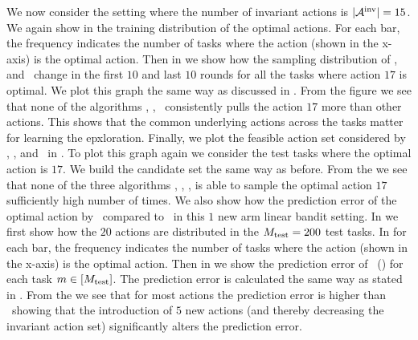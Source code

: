 \documentclass[10pt]{article}
\theoremstyle{plain}
\theoremstyle{definition}
\theoremstyle{remark}
\begin{document}
We now consider the setting where the number of invariant actions is $|\mathcal{A}^{\text{inv}}| = 15$.
We again show in  the training distribution of the optimal actions. For each bar, the frequency indicates the number of tasks where the action (shown in the x-axis) is the optimal action. Then in  we show how the sampling distribution of \dptg, \pred\, and \predt\ change in the first $10$ and last $10$ rounds for all the tasks where action $17$ is optimal. We plot this graph the same way as discussed in .
From the figure  we see that none of the algorithms \pred, \predt, \dptg\ consistently pulls the action $17$ more than other actions. This shows that the common underlying actions across the tasks matter for learning the epxloration.
Finally, we plot the feasible action set considered by \dptg, \pred, and \predt\ in . To plot this graph again we consider the test tasks where the optimal action is $17$. We build the candidate set the same way as before. From the  we see that none of the three algorithms \dptg, \pred, \predt, is able to sample the optimal action $17$ sufficiently high number of times.
We also show how the prediction error of the optimal action by \pred\ compared to \linucb\ in this $1$ new arm linear bandit setting. In  we first show how the $20$ actions are distributed in the $M_{\text{test}}=200$ test tasks. In  for each bar, the frequency indicates the number of tasks where the action (shown in the x-axis) is the optimal action. Then in  we show the prediction error of \pred\ (\gt) for each task $m\in[M_{\text{test}}]$. The prediction error is calculated the same way as stated in .
From the  we see that for most actions the prediction error is higher than \linucb\ showing that the introduction of $5$ new actions (and thereby decreasing the invariant action set) significantly alters the prediction error.
\end{document}
